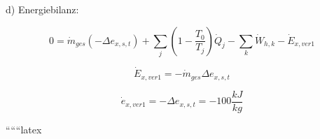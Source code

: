 d) Energiebilanz:

\[
0 = \dot{m}_{ges} \left( -\Delta e_{x,s,t} \right) + \sum_j \left( 1 - \frac{T_0}{T_j} \right) \dot{Q}_j - \sum_k \dot{W}_{h,k} - \dot{E}_{x,ver1}
\]

\[
\dot{E}_{x,ver1} = -\dot{m}_{ges} \Delta e_{x,s,t}
\]

\[
\dot{e}_{x,ver1} = -\Delta e_{x,s,t} = -100 \frac{kJ}{kg}
\]

``````latex